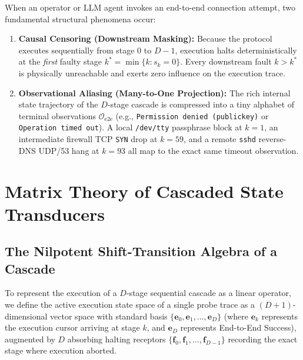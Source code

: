 \documentclass[11pt,a4paper]{article}
\theoremstyle{definition}
\theoremstyle{remark}
\begin{document}
When an operator or LLM agent invokes an end-to-end connection attempt, two fundamental structural phenomena occur:
\begin{enumerate}
    \item \textbf{Causal Censoring (Downstream Masking):} Because the protocol executes sequentially from stage $0$ to $D-1$, execution halts deterministically at the \emph{first} faulty stage $k^* = \min\{k : s_k = 0\}$. Every downstream fault $k > k^*$ is physically unreachable and exerts zero influence on the execution trace.
    \item \textbf{Observational Aliasing (Many-to-One Projection):} The rich internal state trajectory of the $D$-stage cascade is compressed into a tiny alphabet of terminal observations $\mathcal{O}_{\text{e2e}}$ (e.g., \texttt{Permission denied (publickey)} or \texttt{Operation timed out}). A local \texttt{/dev/tty} passphrase block at $k=1$, an intermediate firewall TCP \texttt{SYN} drop at $k=59$, and a remote \texttt{sshd} reverse-DNS UDP/53 hang at $k=93$ all map to the exact same timeout observation.
\end{enumerate}

\section{Matrix Theory of Cascaded State Transducers}

\subsection{The Nilpotent Shift-Transition Algebra of a Cascade}

To represent the execution of a $D$-stage sequential cascade as a linear operator, we define the active execution state space of a single probe trace as a $(D+1)$-dimensional vector space with standard basis $\{\bm{e}_0, \bm{e}_1, \dots, \bm{e}_D\}$ (where $\bm{e}_k$ represents the execution cursor arriving at stage $k$, and $\bm{e}_D$ represents End-to-End Success), augmented by $D$ absorbing halting receptors $\{\bm{f}_0, \bm{f}_1, \dots, \bm{f}_{D-1}\}$ recording the exact stage where execution aborted.
\end{document}
